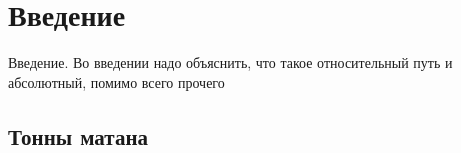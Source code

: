 \chapter{Введение}\label{base:introduction}
Введение. Во введении надо объяснить, что такое относительный путь и абсолютный, помимо всего прочего
\section{Тонны матана}